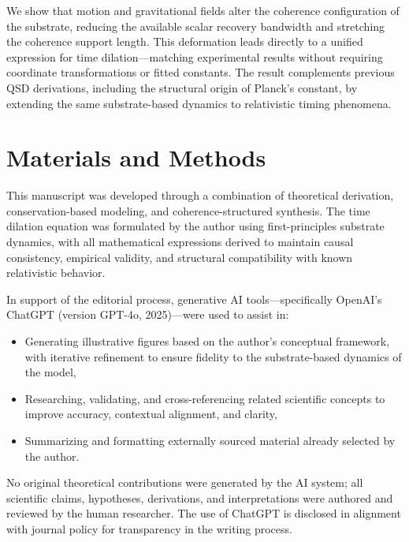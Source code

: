 \documentclass[entropy,article,submit,pdftex,moreauthors]{Definitions/mdpi}
\begin{document}
We show that motion and gravitational fields alter the coherence configuration of the substrate, reducing the available scalar recovery bandwidth and stretching the coherence support length. This deformation leads directly to a unified expression for time dilation—matching experimental results without requiring coordinate transformations or fitted constants. The result complements previous QSD derivations, including the structural origin of Planck’s constant, by extending the same substrate-based dynamics to relativistic timing phenomena.




\section{Materials and Methods}

This manuscript was developed through a combination of theoretical derivation, conservation-based modeling, and coherence-structured synthesis. The time dilation equation was formulated by the author using first-principles substrate dynamics, with all mathematical expressions derived to maintain causal consistency, empirical validity, and structural compatibility with known relativistic behavior.

In support of the editorial process, generative AI tools—specifically OpenAI's ChatGPT (version GPT-4o, 2025)—were used to assist in:
\begin{itemize}
    \item Generating illustrative figures based on the author’s conceptual framework, with iterative refinement to ensure fidelity to the substrate-based dynamics of the model,
    \item Researching, validating, and cross-referencing related scientific concepts to improve accuracy, contextual alignment, and clarity,
    \item Summarizing and formatting externally sourced material already selected by the author.
\end{itemize}

No original theoretical contributions were generated by the AI system; all scientific claims, hypotheses, derivations, and interpretations were authored and reviewed by the human researcher. The use of ChatGPT is disclosed in alignment with journal policy for transparency in the writing process.

\end{document}
